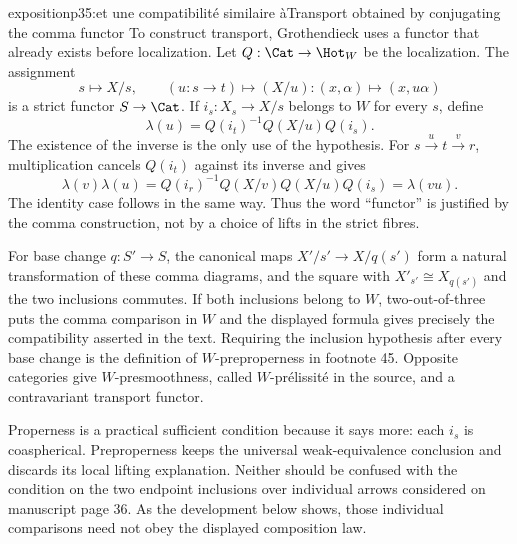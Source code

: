 \begin{dcomment}{exposition}{p35:et une compatibilité similaire à}{Transport obtained by conjugating the comma functor}
To construct transport, Grothendieck uses a functor that already exists before localization. Let $Q:\Cat\to\Hot_W$ be the localization. The assignment
\[
 s\longmapsto X/s,\qquad
 (u:s\to t)\longmapsto(X/u):(x,\alpha)\longmapsto(x,u\alpha)
\]
is a strict functor $S\to\Cat$. If $i_s:X_s\to X/s$ belongs to $W$ for every $s$, define
\[
 \lambda(u)=Q(i_t)^{-1}Q(X/u)Q(i_s).
\]
The existence of the inverse is the only use of the hypothesis. For $s\xrightarrow u t\xrightarrow v r$, multiplication cancels $Q(i_t)$ against its inverse and gives
\[
 \lambda(v)\lambda(u)
 =Q(i_r)^{-1}Q(X/v)Q(X/u)Q(i_s)
 =\lambda(vu).
\]
The identity case follows in the same way. Thus the word ``functor'' is justified by the comma construction, not by a choice of lifts in the strict fibres.

For base change $q:S'\to S$, the canonical maps $X'/s'\to X/q(s')$ form a natural transformation of these comma diagrams, and the square with $X'_{s'}\cong X_{q(s')}$ and the two inclusions commutes. If both inclusions belong to $W$, two-out-of-three puts the comma comparison in $W$ and the displayed formula gives precisely the compatibility asserted in the text. Requiring the inclusion hypothesis after every base change is the definition of $W$-preproperness in footnote 45. Opposite categories give $W$-presmoothness, called $W$-prélissité in the source, and a contravariant transport functor.

Properness is a practical sufficient condition because it says more: each $i_s$ is coaspherical. Preproperness keeps the universal weak-equivalence conclusion and discards its local lifting explanation. Neither should be confused with the condition on the two endpoint inclusions over individual arrows considered on manuscript page 36. As the development below shows, those individual comparisons need not obey the displayed composition law.
\end{dcomment}

